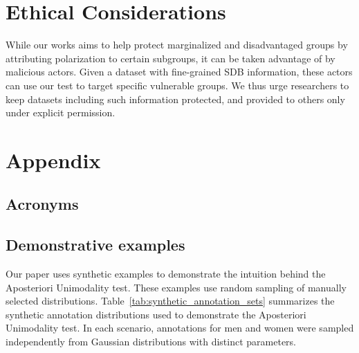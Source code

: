 \documentclass{article}
\begin{document}
\section{Ethical Considerations}

While our works aims to help protect marginalized and disadvantaged groups by attributing polarization to certain subgroups, it can be taken advantage of by malicious actors. Given a dataset with fine-grained \ac{SDB} information, these actors can use our test to target specific vulnerable groups. We thus urge researchers to keep datasets including such information protected, and provided to others only under explicit permission.

\printbibliography


\appendix
\section{Appendix}

\subsection{Acronyms}

\begin{acronym}[WWW]
\end{acronym}


\subsection{Demonstrative examples}

Our paper uses synthetic examples to demonstrate the intuition behind the Aposteriori Unimodality test. These examples use random sampling of manually selected distributions. Table~\ref{tab:synthetic_annotation_sets} summarizes the synthetic annotation distributions used to demonstrate the Aposteriori Unimodality test. In each scenario, annotations for men and women were sampled independently from Gaussian distributions with distinct parameters.
\end{document}
